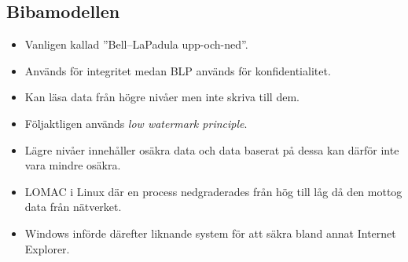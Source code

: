 \subsection{Bibamodellen}
\begin{frame}{\insertsubsectionhead}
  \begin{itemize}
    \item Vanligen kallad ''Bell--LaPadula upp-och-ned''.
    \item Används för integritet medan BLP används för konfidentialitet.
    \item Kan läsa data från högre nivåer men inte skriva till dem.
    \item Följaktligen används \emph{low watermark principle}.
    \item Lägre nivåer innehåller osäkra data och data baserat på dessa kan 
      därför inte vara mindre osäkra.
    \item LOMAC i Linux där en process nedgraderades från hög till låg då den 
      mottog data från nätverket.
    \item Windows införde därefter liknande system för att säkra bland annat 
      Internet Explorer.
  \end{itemize}
\end{frame}

